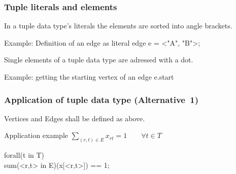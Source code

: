 \begin{frame}
 \frametitle{Tuple literals and elements}
 In a tuple data type's literals the elements are sorted into angle brackets.
 \begin{block}{Example: Definition of an edge as literal}
  \ttfamily
    edge e = <"A", "B">;
 \end{block}
 
 Single elements of a tuple data type are adressed with a dot.
 \begin{block}{Example: getting the starting vertex of an edge}
  {\ttfamily e.start} \qquad\textrightarrow{}
 \end{block}
\end{frame}

\begin{frame}
 \frametitle{Application of tuple data type (Alternative~1)}
 Vertices and Edges shall be defined as above.
 
 \begin{block}{Application example}
  $\displaystyle\sum_{(r, t)\in E} x_{rt} = 1  \qquad\forall t\in T$\\
  \begin{center}
  \end{center}
  {\ttfamily forall(\alert{t} in T)\\
  \quad sum(<r,\alert{t}> in E)(x[<r,t>]) == 1;}
 \end{block}
\end{frame}



